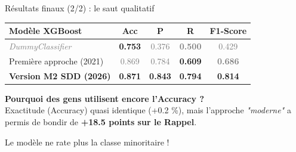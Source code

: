 \documentclass[aspectratio=169, 10pt]{beamer}
\begin{document}
\begin{frame}{Résultats finaux (2/2) : le saut qualitatif}
    \begin{table}[]
        \centering
        \begin{tabular}{lcccc}
        \toprule
        \textbf{Modèle XGBoost} & \textbf{Acc} & \textbf{P} & \textbf{R} & \textbf{F1-Score} \\
        \midrule
        \textcolor{gray}{\textit{DummyClassifier}} & \alert{\textbf{0.753}} & \textcolor{gray}{0.376} & \textcolor{gray}{\textbf{0.500}} & \textcolor{gray}{0.429} \\
        \midrule
        Première approche (2021) & \textcolor{gray}{0.869} & \textcolor{gray}{0.784} & \alert{\textbf{0.609}} & \textcolor{gray}{\textbf{0.686}} \\
        \textbf{Version M2 SDD (2026)} & \textbf{0.871} & \textbf{0.843} & \alert{\textbf{0.794}} & \textbf{0.814} \\
        \bottomrule
        \end{tabular}
    \end{table}
    \pause

    \vspace{0.5cm}
    \pause
    \textbf{Pourquoi des gens utilisent encore l'Accuracy ?}\\
    
    \pause
    Exactitude (Accuracy) quasi identique (+0.2 \%), mais l'approche \textit{"moderne"} a permis de bondir de \textbf{+18.5 points sur le Rappel}.
    \pause
    
    Le modèle ne rate plus la classe minoritaire !
\end{frame}
\end{document}
